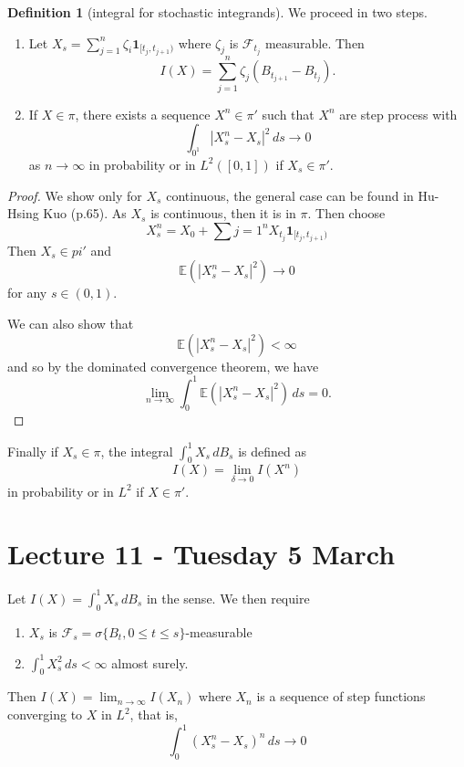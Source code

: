 \documentclass[10pt, oneside, reqno]{amsart}
\theoremstyle{plain}%
\theoremstyle{definition}
\newtheorem{defn}[thm]{Definition}
\theoremstyle{remark}
\newcommand{\E}{\mathbb{E}}
\newcommand{\sigf}{\mathcal{F}}
\begin{document}
\begin{defn}[\ito integral for stochastic integrands]
	We proceed in two steps.  
	\begin{enumerate}
		\item Let $X_s = \sum_{j=1}^n \zeta_i \mathbf{1}_{[t_j, t_{j+1})}$ where $\zeta_j$ is $\sigf_{t_j}$ measurable.  Then \[
			I(X) = \sum_{j=1}^n \zeta_j (B_{t_{j+1}} - B_{t_j}).
		\]
		\item If $X \in \pi$, there exists a sequence $X^n \in \pi'$ such that $X^n$ are step process with \[
			\int_{0^1} | X^n_s - X_s |^2 \, ds \rightarrow 0
		\] as $n \rightarrow \infty$ in probability or in $L^2([0,1])$ if $X_s \in \pi'$.  
	\end{enumerate}
	\begin{proof}
		We show only for $X_s$ continuous, the general case can be found in Hu-Hsing Kuo (p.65).  As $X_s$ is continuous, then it is in $\pi$.  Then choose \[
			X^n_s = X_0 + \sum{j=1}^n X_{t_j} \mathbf{1}_{[t_j, t_{j+1})}
		\]  Then $X_s \in pi'$ and \[
			\E(|X^n_s - X_s|^2) \rightarrow 0
		\] for any $s \in (0,1)$.
		
		We can also show that \[
			\E(|X^n_s - X_s|^2) < \infty
		\] and so by the dominated convergence theorem, we have \[
			\lim_{n \rightarrow \infty} \int_0^1 \E(|X^n_s - X_s|^2) \, ds = 0.
		\]
	\end{proof}
	\item Finally if $X_s \in \pi$, the \ito integral $\int_0^1 X_s \, dB_s$ is defined as \[
		I(X) = \lim_{\delta \rightarrow 0} I(X^n)
	\] in probability or in $L^2$ if $X \in \pi'$.  
\end{defn}

\section{Lecture 11 - Tuesday 5 March} %
\label{sec:lecture_11_tuesday_5_march}
Let $I(X) = \int_0^1 X_s \, dB_s$ in the \ito sense.  We then require
\begin{enumerate}
	\item $X_s$ is $\sigf_s = \sigma \{ B_t, 0 \leq t \leq s \}$-measurable
	\item $\int_0^1 X_s^2 \, ds < \infty$ almost surely.  
\end{enumerate}

Then $I(X) = \lim_{n \rightarrow \infty} I(X_n)$ where $X_n$ is a sequence of step functions converging to $X$ in $L^2$, that is, \[
	\int_0^1 (X_s^n - X_s)^n \, ds \rightarrow 0
\]
\end{document}
